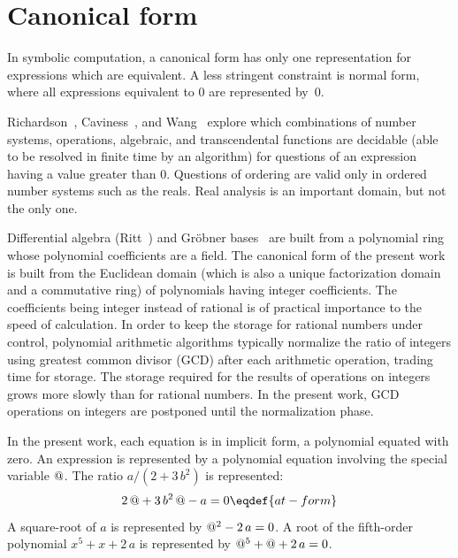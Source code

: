 

\readtocfile

\section{Canonical form}

In symbolic computation, a canonical form has only one representation
for expressions which are equivalent.  A less stringent constraint is
normal form, where all expressions equivalent to 0 are represented
by~0.

Richardson~\cite{10.2307/2271358},
Caviness~\cite{Caviness:1970:CFS:321574.321591}, and
Wang~\cite{10.1145/321850.321856} explore which combinations of number
systems, operations, algebraic, and transcendental functions are
decidable (able to be resolved in finite time by an algorithm) for
questions of an expression having a value greater than 0.  Questions
of ordering are valid only in ordered number systems such as the
reals.  Real analysis is an important domain, but not the only one.

Differential algebra (Ritt~\cite{ritt1966differential}) and Gr\"obner
bases~\cite{alma991010801422205596} are built from a polynomial ring
whose polynomial coefficients are a field.  The canonical form of the
present work is built from the Euclidean domain (which is also a
unique factorization domain and a commutative ring) of polynomials
having integer coefficients.\numberedfootnote
{The coefficients being integer instead of rational is of practical
 importance to the speed of calculation.  In order to keep the storage
 for rational numbers under control, polynomial arithmetic algorithms
 typically normalize the ratio of integers using greatest common
 divisor (GCD) after each arithmetic operation, trading time for
 storage.  The storage required for the results of operations on
 integers grows more slowly than for rational numbers.  In the present
 work, GCD operations on integers are postponed until the
 normalization phase.}

In the present work, each equation is in implicit form, a polynomial
equated with zero.  An expression is represented by a polynomial
equation involving the special variable ${@}$.  The ratio
$a/(2+3\,b^2)$ is represented:
$$2\,\at+3\,b^2\,\at-a=0\eqdef{at-form}$$
A square-root of $a$ is represented by ${@}^2-2\,a=0$.
A root of the fifth-order polynomial $x^5+x+2\,a$ is represented by
${@}^5+{@}+2\,a=0$.

